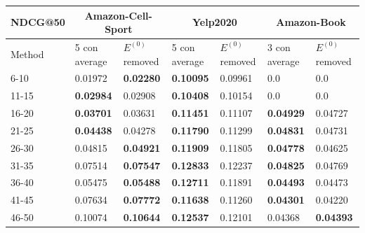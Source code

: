 \begin{table}[h!]
    \centering
    \begin{tabular}{|l|l|l||l|l||l|l|}
        \hline
        NDCG@50   & \multicolumn{2}{c||}{Amazon-Cell-Sport} & \multicolumn{2}{c||}{Yelp2020} & \multicolumn{2}{c|}{Amazon-Book}                                                            \\ \hline
        Method    & 5 con average                           & $E^{(0)}$ removed              & 5 con average                    & $E^{(0)}$ removed & 3 con average    & $E^{(0)}$ removed \\ \hline
        6-10      & 0.01972                                 & \textbf{0.02280}               & \textbf{0.10095}                 & 0.09961           & 0.0              & 0.0               \\ \hline
        11-15     & \textbf{0.02984}                        & 0.02908                        & \textbf{0.10408}                 & 0.10154           & 0.0              & 0.0               \\ \hline
        16-20     & \textbf{0.03701}                        & 0.03631                        & \textbf{0.11451}                 & 0.11107           & \textbf{0.04929} & 0.04727           \\ \hline
        21-25     & \textbf{0.04438}                        & 0.04278                        & \textbf{0.11790}                 & 0.11299           & \textbf{0.04831} & 0.04731           \\ \hline
        26-30     & 0.04815                                 & \textbf{0.04921}               & \textbf{0.11909}                 & 0.11805           & \textbf{0.04778} & 0.04625           \\ \hline
        31-35     & 0.07514                                 & \textbf{0.07547}               & \textbf{0.12833}                 & 0.12237           & \textbf{0.04825} & 0.04769           \\ \hline
        36-40     & 0.05475                                 & \textbf{0.05488}               & \textbf{0.12711}                 & 0.11891           & \textbf{0.04493} & 0.04473           \\ \hline
        41-45     & 0.07634                                 & \textbf{0.07772}               & \textbf{0.11638}                 & 0.11260           & \textbf{0.04301} & 0.04220           \\ \hline
        46-50     & 0.10074                                 & \textbf{0.10644}               & \textbf{0.12537}                 & 0.12101           & 0.04368          & \textbf{0.04393}  \\ \hline

\end{tabular}
\end{table}
